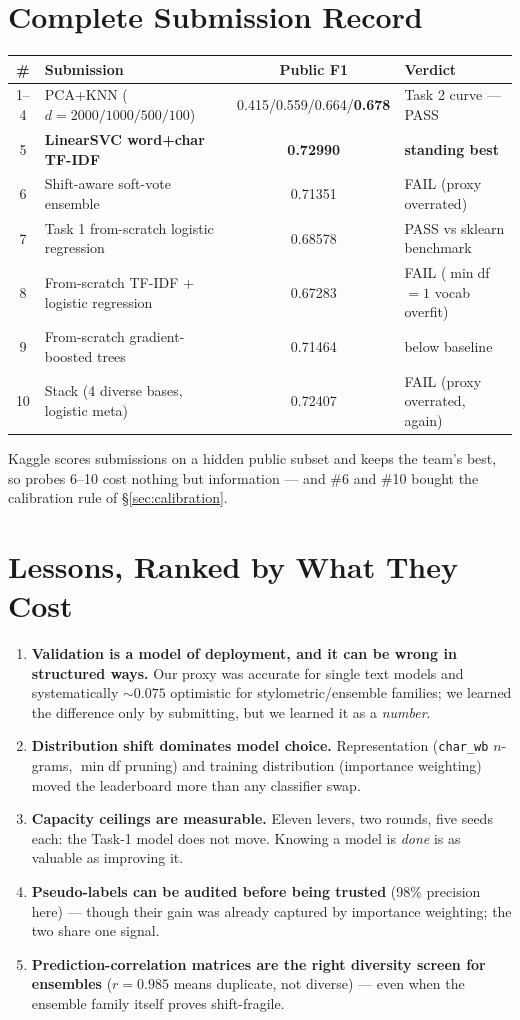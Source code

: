 \documentclass[11pt,a4paper]{article}
\begin{document}
\section{Complete Submission Record}
\begin{center}
\begin{tabular}{clcl}
\toprule
\# & Submission & Public F1 & Verdict\\
\midrule
1--4 & PCA+KNN ($d = 2000/1000/500/100$) & 0.415/0.559/0.664/\textbf{0.678} & Task 2 curve --- PASS\\
5 & \textbf{LinearSVC word+char TF-IDF} & \textbf{0.72990} & \textbf{standing best}\\
6 & Shift-aware soft-vote ensemble & 0.71351 & FAIL (proxy overrated)\\
7 & Task 1 from-scratch logistic regression & 0.68578 & PASS vs sklearn benchmark\\
8 & From-scratch TF-IDF + logistic regression & 0.67283 & FAIL ($\min$df$=1$ vocab overfit)\\
9 & From-scratch gradient-boosted trees & 0.71464 & below baseline\\
10 & Stack (4 diverse bases, logistic meta) & 0.72407 & FAIL (proxy overrated, again)\\
\bottomrule
\end{tabular}
\end{center}
Kaggle scores submissions on a hidden public subset and keeps the team's best, so probes 6--10 cost nothing but information --- and \#6 and \#10 bought the calibration rule of \S\ref{sec:calibration}.

\section{Lessons, Ranked by What They Cost}
\begin{enumerate}
\item \textbf{Validation is a model of deployment, and it can be wrong in structured ways.} Our proxy was accurate for single text models and systematically ${\sim}0.075$ optimistic for stylometric/ensemble families; we learned the difference only by submitting, but we learned it as a \emph{number}.
\item \textbf{Distribution shift dominates model choice.} Representation (\texttt{char\_wb} $n$-grams, $\min$df pruning) and training distribution (importance weighting) moved the leaderboard more than any classifier swap.
\item \textbf{Capacity ceilings are measurable.} Eleven levers, two rounds, five seeds each: the Task-1 model does not move. Knowing a model is \emph{done} is as valuable as improving it.
\item \textbf{Pseudo-labels can be audited before being trusted} (98\% precision here) --- though their gain was already captured by importance weighting; the two share one signal.
\item \textbf{Prediction-correlation matrices are the right diversity screen for ensembles} ($r{=}0.985$ means duplicate, not diverse) --- even when the ensemble family itself proves shift-fragile.
\end{enumerate}
\end{document}
